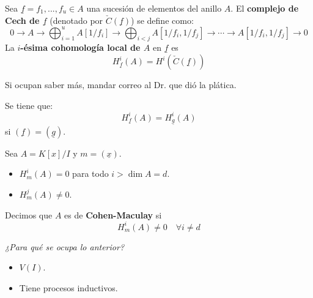 \documentclass[12pt]{report}
\newcounter{it}
\theoremstyle{largebreak}
\begin{document}
    \begin{mydef}
        Sea $\underline{f}=f_1,...,f_u\in A$ una sucesión de elementos del anillo $A$. El \textbf{complejo de Cech de $\underline{f}$} (denotado por $\check{C}(\underline{f})$) se define como:
        \begin{equation*}
            0\rightarrow A\rightarrow\bigoplus_{ i=1}^u A\left[1/f_i \right]\rightarrow\bigoplus_{ i<j}A\left[1/f_i,1/f_j \right]\rightarrow\cdots\rightarrow A[1/f_i,1/f_j]\rightarrow 0
        \end{equation*}
        La \textbf{$i$-ésima cohomología local de $A$} en $\underline{f}$ es
        \begin{equation*}
            H_{\underline{f}}^i(A)=H^i(\check{C}(\underline{f}))
        \end{equation*}
    \end{mydef}

    Si ocupan saber más, mandar correo al Dr. que dió la plática.
    
    \begin{propo}
        Se tiene que:
        \begin{equation*}
            H_{\underline{f}}^i(A)=H_{\underline{g}}^i(A)
        \end{equation*}
        si $(\underline{f})=(\underline{g})$.
    \end{propo}

    \begin{propo}
        Sea $A=K[x]/I$ y $m=(\underline{x})$.
        \begin{itemize}
            \item $H_m^i(A)=0$ para todo $i>\dim A=d$.
            \item $H_m^j(A)\neq0$.
        \end{itemize}
    \end{propo}

    \begin{mydef}
        Decimos que $A$ es de \textbf{Cohen-Maculay} si
        \begin{equation*}
            H_m^i(A)\neq0\quad\forall i\neq d 
        \end{equation*}
    \end{mydef}

    \begin{center}
        \textit{¿Para qué se ocupa lo anterior?}
    \end{center}

    \begin{itemize}
        \item $V(I)$.
        \item Tiene procesos inductivos.
    \end{itemize}
\end{document}
